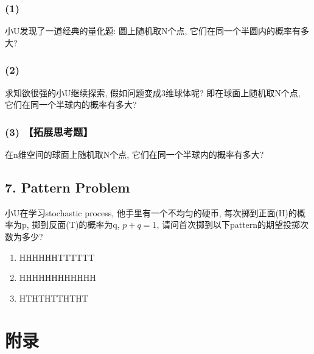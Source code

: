 \documentclass[UTF8]{ctexart}
\begin{document}
\subsubsection*{(1)}
小U发现了一道经典的量化题: 圆上随机取N个点, 它们在同一个半圆内的概率有多大?

\subsubsection*{(2)}
求知欲很强的小U继续探索, 假如问题变成3维球体呢? 即在球面上随机取N个点, 它们在同一个半球内的概率有多大?

\subsubsection*{(3) 【拓展思考题】}
在n维空间的球面上随机取N个点, 它们在同一个半球内的概率有多大?

\subsection*{7. Pattern Problem}
小U在学习stochastic process, 他手里有一个不均匀的硬币, 每次掷到正面(H)的概率为p, 掷到反面(T)的概率为q, $p+q=1$, 请问首次掷到以下pattern的期望投掷次数为多少?
\begin{enumerate}
    \item HHHHHHTTTTTT
    \item HHHHHHHHHHHH
    \item HTHTHTTHTHT
\end{enumerate}



\section*{附录}
\end{document}
